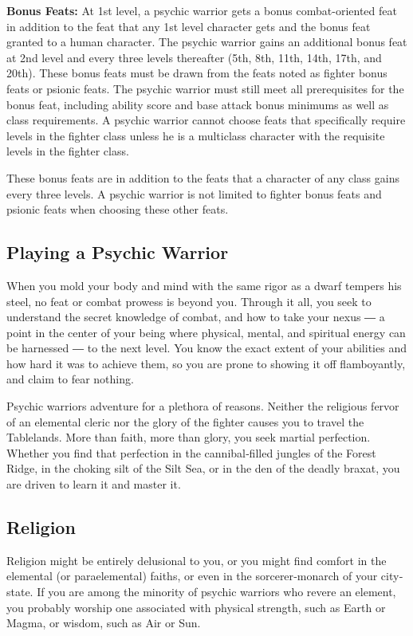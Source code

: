 \textbf{Bonus Feats:} At 1st level, a psychic warrior gets a bonus combat-oriented feat in addition to the feat that any 1st level character gets and the bonus feat granted to a human character. The psychic warrior gains an additional bonus feat at 2nd level and every three levels thereafter (5th, 8th, 11th, 14th, 17th, and 20th). These bonus feats must be drawn from the feats noted as fighter bonus feats or psionic feats. The psychic warrior must still meet all prerequisites for the bonus feat, including ability score and base attack bonus minimums as well as class requirements. A psychic warrior cannot choose feats that specifically require levels in the fighter class unless he is a multiclass character with the requisite levels in the fighter class.

These bonus feats are in addition to the feats that a character of any class gains every three levels. A psychic warrior is not limited to fighter bonus feats and psionic feats when choosing these other feats.

\subsection{Playing a Psychic Warrior}

When you mold your body and mind with the same rigor as a dwarf tempers his steel, no feat or combat prowess is beyond you. Through it all, you seek to understand the secret knowledge of combat, and how to take your nexus ― a point in the center of your being where physical, mental, and spiritual energy can be harnessed ― to the next level. You know the exact extent of your abilities and how hard it was to achieve them, so you are prone to showing it off flamboyantly, and claim to fear nothing.

Psychic warriors adventure for a plethora of reasons. Neither the religious fervor of an elemental cleric nor the glory of the fighter causes you to travel the Tablelands. More than faith, more than glory, you seek martial perfection. Whether you find that perfection in the cannibal‐filled jungles of the Forest Ridge, in the choking silt of the Silt Sea, or in the den of the deadly braxat, you are driven to learn it and master it.

\subsection{Religion}

Religion might be entirely delusional to you, or you might find comfort in the elemental (or paraelemental) faiths, or even in the sorcerer‐monarch of your city‐state. If you are among the minority of psychic warriors who revere an element, you probably worship one associated with physical strength, such as Earth or Magma, or wisdom, such as Air or Sun.

